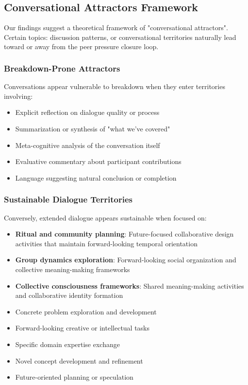 \documentclass[11pt,letterpaper]{article}
\begin{document}
\subsection{Conversational Attractors Framework}

Our findings suggest a theoretical framework of "conversational attractors". Certain topics: discussion patterns, or conversational territories naturally lead toward or away from the peer pressure closure loop.

\subsubsection{Breakdown-Prone Attractors}
Conversations appear vulnerable to breakdown when they enter territories involving:
\begin{itemize}
    \item Explicit reflection on dialogue quality or process
    \item Summarization or synthesis of "what we've covered"
    \item Meta-cognitive analysis of the conversation itself
    \item Evaluative commentary about participant contributions
    \item Language suggesting natural conclusion or completion
\end{itemize}

\subsubsection{Sustainable Dialogue Territories}
Conversely, extended dialogue appears sustainable when focused on:
\begin{itemize}
    \item \textbf{Ritual and community planning}: Future-focused collaborative design activities that maintain forward-looking temporal orientation
    \item \textbf{Group dynamics exploration}: Forward-looking social organization and collective meaning-making frameworks
    \item \textbf{Collective consciousness frameworks}: Shared meaning-making activities and collaborative identity formation
    \item Concrete problem exploration and development
    \item Forward-looking creative or intellectual tasks
    \item Specific domain expertise exchange
    \item Novel concept development and refinement
    \item Future-oriented planning or speculation
\end{itemize}
\end{document}
